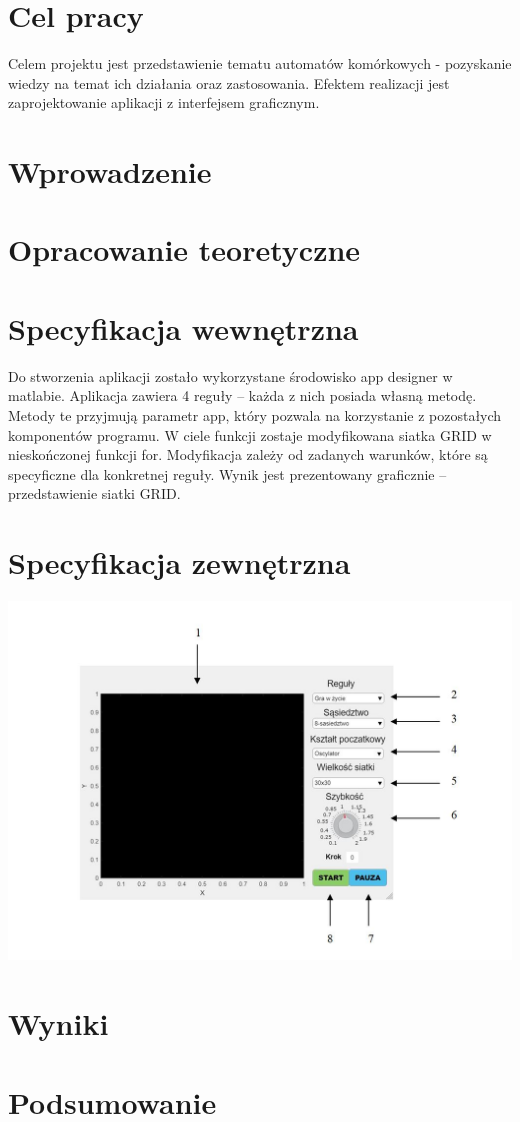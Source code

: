 \chapter{Cel pracy}
Celem projektu jest przedstawienie tematu automatów komórkowych - pozyskanie wiedzy na temat ich działania oraz zastosowania. Efektem realizacji jest zaprojektowanie aplikacji z interfejsem graficznym.

\chapter{Wprowadzenie}

\chapter{Opracowanie teoretyczne}

\chapter{Specyfikacja wewnętrzna}

Do stworzenia aplikacji zostało wykorzystane środowisko app designer w matlabie. 
Aplikacja zawiera 4 reguły – każda z nich posiada własną metodę. Metody te przyjmują parametr app, który pozwala na korzystanie z pozostałych komponentów programu. W ciele funkcji zostaje modyfikowana siatka GRID w nieskończonej funkcji for. Modyfikacja zależy od zadanych warunków, które są specyficzne dla konkretnej reguły. Wynik jest prezentowany graficznie – przedstawienie siatki GRID.

\chapter{Specyfikacja zewnętrzna}

\includegraphics[scale=0.6]{zd}





\chapter{Wyniki}
\chapter{Podsumowanie}
